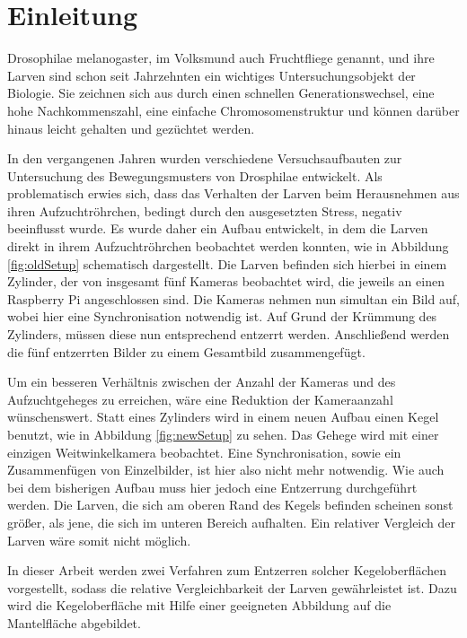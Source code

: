 \chapter{Einleitung}
Drosophilae melanogaster, im Volksmund auch Fruchtfliege genannt, und ihre Larven sind schon seit Jahrzehnten ein wichtiges Untersuchungsobjekt der Biologie. Sie zeichnen sich aus durch einen schnellen Generationswechsel, eine hohe Nachkommenszahl, eine einfache Chromosomenstruktur und können darüber hinaus leicht gehalten und gezüchtet werden.

In den vergangenen Jahren wurden verschiedene Versuchsaufbauten zur Untersuchung des Bewegungsmusters von Drosphilae entwickelt.
Als problematisch erwies sich, dass das Verhalten der Larven beim Herausnehmen aus ihren Aufzuchtröhrchen, bedingt durch den ausgesetzten Stress, negativ beeinflusst wurde.
Es wurde daher ein Aufbau entwickelt, in dem die Larven direkt in ihrem Aufzuchtröhrchen beobachtet werden konnten, wie in Abbildung \ref{fig:oldSetup} schematisch dargestellt.
Die Larven befinden sich hierbei in einem Zylinder, der von insgesamt fünf Kameras beobachtet wird, die jeweils an einen Raspberry Pi angeschlossen sind. Die Kameras nehmen nun simultan ein Bild auf, wobei hier eine Synchronisation notwendig ist. Auf Grund der Krümmung des Zylinders, müssen diese nun entsprechend entzerrt werden. Anschließend werden die fünf entzerrten Bilder zu einem Gesamtbild zusammengefügt.

Um ein besseren Verhältnis zwischen der Anzahl der Kameras und des Aufzuchtgeheges zu erreichen, wäre eine Reduktion der Kameraanzahl wünschenswert.
Statt eines Zylinders wird in einem neuen Aufbau einen Kegel benutzt, wie in Abbildung \ref{fig:newSetup} zu sehen. Das Gehege wird mit einer einzigen Weitwinkelkamera beobachtet. Eine Synchronisation, sowie ein Zusammenfügen von Einzelbilder, ist hier also nicht mehr notwendig.
Wie auch bei dem bisherigen Aufbau muss hier jedoch eine Entzerrung durchgeführt werden. Die Larven, die sich am oberen Rand des Kegels befinden scheinen sonst größer, als jene, die sich im unteren Bereich aufhalten. Ein relativer Vergleich der Larven wäre somit nicht möglich.

In dieser Arbeit werden zwei Verfahren zum Entzerren solcher Kegeloberflächen vorgestellt, sodass die relative Vergleichbarkeit der Larven gewährleistet ist.
Dazu wird die Kegeloberfläche mit Hilfe einer geeigneten Abbildung auf die Mantelfläche abgebildet.

